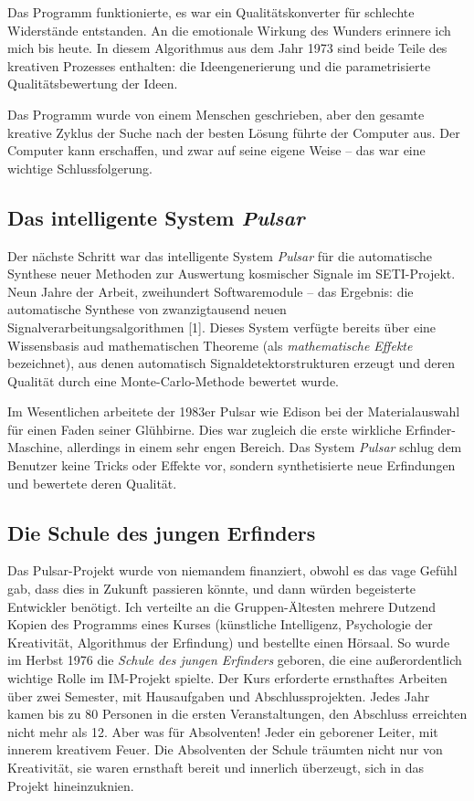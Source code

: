 \documentclass[11pt,a4paper]{article}
\begin{document}
Das Programm funktionierte, es war ein Qualitätskonverter für schlechte
Widerstände entstanden. An die emotionale Wirkung des Wunders erinnere ich
mich bis heute. In diesem Algorithmus aus dem Jahr 1973 sind beide Teile des
kreativen Prozesses enthalten: die Ideengenerierung und die parametrisierte
Qualitätsbewertung der Ideen.

Das Programm wurde von einem Menschen geschrieben, aber den gesamte kreative
Zyklus der Suche nach der besten Lösung führte der Computer aus. Der Computer
kann erschaffen, und zwar auf seine eigene Weise -- das war eine wichtige
Schlussfolgerung.

\subsection{Das intelligente System \emph{Pulsar}}

Der nächste Schritt war das intelligente System \emph{Pulsar} für die
automatische Synthese neuer Methoden zur Auswertung kosmischer Signale im
SETI-Projekt.  Neun Jahre der Arbeit, zweihundert Softwaremodule -- das
Ergebnis: die automatische Synthese von zwanzigtausend neuen
Signalverarbeitungsalgorithmen [1]. Dieses System verfügte bereits über eine
Wissensbasis aud mathematischen Theoreme (als \emph{mathematische Effekte}
bezeichnet), aus denen automatisch Signaldetektorstrukturen erzeugt und deren
Qualität durch eine Monte-Carlo-Methode bewertet wurde.

Im Wesentlichen arbeitete der 1983er Pulsar wie Edison bei der Materialauswahl
für einen Faden seiner Glühbirne. Dies war zugleich die erste wirkliche
Erfinder-Maschine, allerdings in einem sehr engen Bereich. Das System
\emph{Pulsar} schlug dem Benutzer keine Tricks oder Effekte vor, sondern
synthetisierte neue Erfindungen und bewertete deren Qualität.

\subsection{Die Schule des jungen Erfinders}

Das Pulsar-Projekt wurde von niemandem finanziert, obwohl es das vage Gefühl
gab, dass dies in Zukunft passieren könnte, und dann würden begeisterte
Entwickler benötigt. Ich verteilte an die Gruppen-Ältesten mehrere Dutzend
Kopien des Programms eines Kurses (künstliche Intelligenz, Psychologie der
Kreativität, Algorithmus der Erfindung) und bestellte einen Hörsaal.  So wurde
im Herbst 1976 die \emph{Schule des jungen Erfinders} geboren, die eine
außerordentlich wichtige Rolle im IM-Projekt spielte. Der Kurs erforderte
ernsthaftes Arbeiten über zwei Semester, mit Hausaufgaben und
Abschlussprojekten.  Jedes Jahr kamen bis zu 80 Personen in die ersten
Veranstaltungen, den Abschluss erreichten nicht mehr als 12. Aber was für
Absolventen!  Jeder ein geborener Leiter, mit innerem kreativem Feuer.  Die
Absolventen der Schule träumten nicht nur von Kreativität, sie waren ernsthaft
bereit und innerlich überzeugt, sich in das Projekt hineinzuknien.
\end{document}

